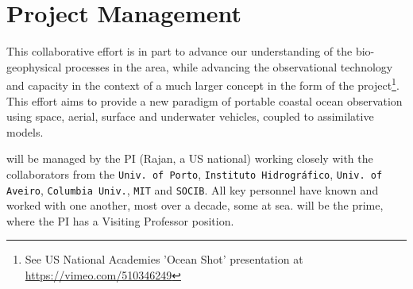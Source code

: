\section{Project Management}

This collaborative effort is in part to advance our understanding of
the bio-geophysical processes in the \naz area, while advancing the
observational technology and capacity in the context of a much larger
concept in the form of the \met project\footnote{See US National
  Academies 'Ocean Shot' presentation at
  \url{https://vimeo.com/510346249}}. This effort aims to provide a
new paradigm of portable coastal ocean observation using space,
aerial, surface and underwater vehicles, coupled to assimilative
models.

\proj will be managed by the PI (Rajan, a US national) working closely
with the collaborators from the \texttt{Univ. of Porto},
\texttt{Instituto Hidrogr\'{a}fico}, \texttt{Univ. of Aveiro},
\texttt{Columbia Univ.}, \texttt{MIT} and \texttt{SOCIB}.  All key
personnel have known and worked with one another, most over a decade,
some at sea. \univ will be the prime, where the PI has a Visiting
Professor position.

